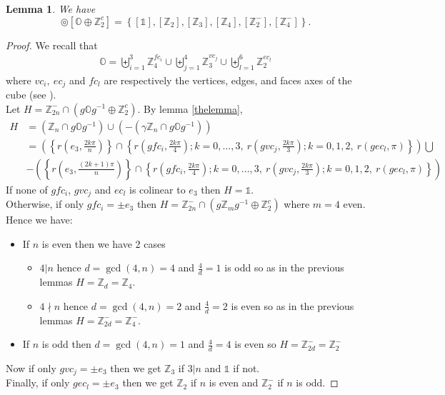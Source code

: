 \documentclass[11pt,a4paper]{amsart}
\newtheorem{lem}[thm]{Lemma}
\theoremstyle{definition}
\newcommand{\ZZ}{\mathbb{Z}}                %
\newcommand{\octa}{\mathbb{O}}              %
\newcommand{\1}{\mathds{1}}		            %
\newcommand{\set}[1]{\left\{#1\right\}}     %
\begin{document}
\begin{lem}\label{lem5.7}
We have
\begin{equation*}
[\ZZ_{2n}^-]\circledcirc[\octa\oplus \ZZ_2^c]=\set{[\1],[\ZZ_2],[\ZZ_3],[\ZZ_4],[\ZZ_2^-],[\ZZ_4^-]}.
\end{equation*}
\end{lem}
\begin{proof}
We recall that
\begin{align*}
\octa= \displaystyle \biguplus_{i=1}^3 \ZZ_4^{fc_i} \cup \biguplus_{j=1}^4 \ZZ_3^{vc_j}\cup \biguplus_{l=1}^6 \ZZ_2^{ec_l}
\end{align*}
where $vc_i,\ ec_j$ and $fc_l$ are respectively the vertices, edges, and faces axes of the cube (see \cite[Appendix A]{olive2019}).\\
Let $H=\ZZ_{2n}^- \cap (g \octa g^{-1}\oplus \ZZ_2^c)$.
By lemma \ref{thelemma},
\begin{align*}
H&=(\ZZ_n\cap g \octa g^{-1})\cup (-(\gamma\ZZ_n\cap g \octa g^{-1}))\\
 &=\left(\set{r(e_3,\frac{2k\pi}{n})} \cap \set{r(gfc_i,\frac{2k\pi}{4});k=0,\dotsc,3,\ r(g vc_j,\frac{2k\pi}{3});k=0,1,2,\ r(g ec_l,\pi)}\right)\bigcup\\
 &-\left(\set{r(e_3,\frac{(2k+1)\pi}{n})}\cap \set{r(gfc_i,\frac{2k\pi}{4});k=0,\dotsc,3,\ r(g vc_j,\frac{2k\pi}{3});k=0,1,2,\ r(g ec_l,\pi)}\right)
\end{align*}
If none of $gfc_i$, $gvc_j$ and $ ec_l$ is colinear to $e_3$ then $H=\1$.\\
Otherwise, if only $gfc_i=\pm e_3$ then $H=\ZZ_{2n}^- \cap (g\ZZ_m g^{-1}\oplus \ZZ_2^c)$ where $m=4$ even. \\ Hence we have:
\begin{itemize}
\item If $n$ is even then we have 2 cases
\begin{itemize}
\item $4|n$ hence $d=\gcd(4,n)=4$ and $\frac{4}{d}=1$ is odd so as in the previous lemmas $H=\ZZ_d=\ZZ_4$.
\item $4\nmid n$ hence $d=\gcd(4,n)=2$ and $\frac{4}{d}=2$ is even so as in the previous lemmas $H=\ZZ_{2d}^-=\ZZ_4^-$.
\end{itemize}
\item If $n$ is odd then $d=\gcd(4,n)=1$ and $\frac{4}{d}=4$ is even so $H=\ZZ_{2d}^-=\ZZ_2^-$
\end{itemize}
Now if only $gvc_j=\pm e_3$ then we get $\ZZ_3$ if $3|n$ and $\1$ if not.\\
Finally, if only $gec_l=\pm e_3$ then we get $\ZZ_2$ if $n$ is even and $\ZZ_2^-$ if $n$ is odd.
\end{proof}
\end{document}
